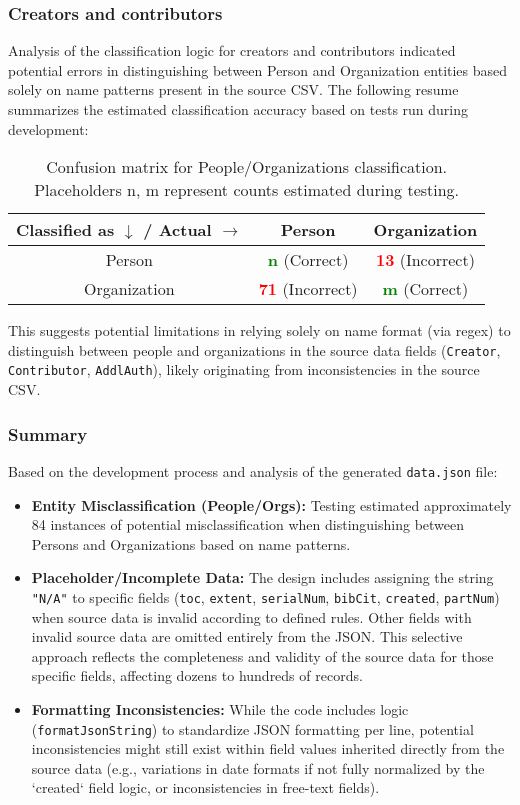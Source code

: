 \subsubsection{Creators and contributors}
Analysis of the classification logic for creators and contributors indicated potential errors in distinguishing between Person and Organization entities based solely on name patterns present in the source CSV. The following resume summarizes the estimated classification accuracy based on tests run during development:
\begin{table}[h]
    \centering
    \begin{tabular}{|c|c|c|}
        \hline
        Classified as $\downarrow$ / Actual $\rightarrow$ & Person & Organization \\
        \hline
        Person &  \textcolor{green}{\textbf{n}} (Correct) & \textcolor{red}{\textbf{13}} (Incorrect) \\
        \hline
        Organization & \textcolor{red}{\textbf{71}} (Incorrect) &  \textcolor{green}{\textbf{m}} (Correct) \\
        \hline
    \end{tabular}
    \caption{Confusion matrix for People/Organizations classification. Placeholders n, m represent counts estimated during testing.}
    \label{tab:people_org}
\end{table}
\newline
This suggests potential limitations in relying solely on name format (via regex) to distinguish between people and organizations in the source data fields (\texttt{Creator}, \texttt{Contributor}, \texttt{AddlAuth}), likely originating from inconsistencies in the source CSV.

\subsubsection{Summary}
Based on the development process and analysis of the generated \texttt{data.json} file:
\begin{itemize}
    \item \textbf{Entity Misclassification (People/Orgs):} Testing estimated approximately 84 instances of potential misclassification when distinguishing between Persons and Organizations based on name patterns.
    \item \textbf{Placeholder/Incomplete Data:} The design includes assigning the string \texttt{"N/A"} to specific fields (\texttt{toc}, \texttt{extent}, \texttt{serialNum}, \texttt{bibCit}, \texttt{created}, \texttt{partNum}) when source data is invalid according to defined rules. Other fields with invalid source data are omitted entirely from the JSON. This selective approach reflects the completeness and validity of the source data for those specific fields, affecting dozens to hundreds of records.
    \item \textbf{Formatting Inconsistencies:} While the code includes logic (\texttt{formatJsonString}) to standardize JSON formatting per line, potential inconsistencies might still exist within field values inherited directly from the source data (e.g., variations in date formats if not fully normalized by the `created` field logic, or inconsistencies in free-text fields).
\end{itemize}